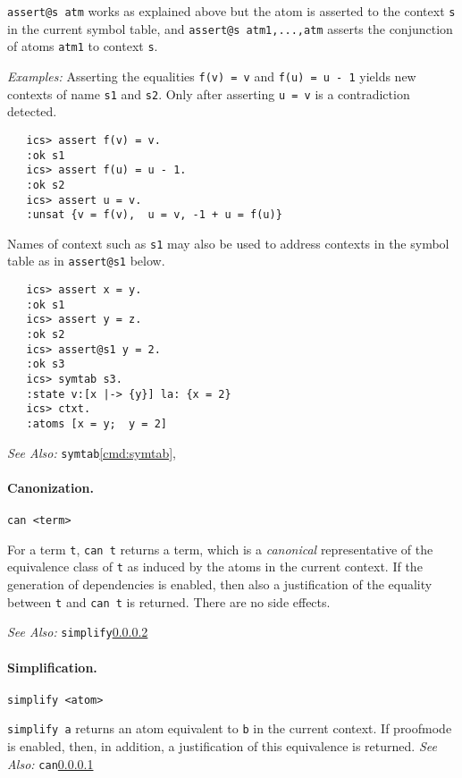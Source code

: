 \documentclass[12pt]{article}
\begin{document}
 \texttt {assert@s atm} works as explained above but the atom is asserted to
 the context \texttt{s} in the current symbol table, and 
 \texttt {assert@s atm1,...,atm} asserts the conjunction of atoms \texttt{atm1} to 
 context \texttt{s}.

\noindent
{\em Examples:} Asserting the equalities \texttt{f(v) = v} and \texttt{f(u) = u - 1}
yields new contexts of name \texttt{s1} and \texttt{s2}\@. Only after 
asserting \texttt{u = v} is a contradiction detected.
   \begin{verbatim}
   ics> assert f(v) = v.
   :ok s1
   ics> assert f(u) = u - 1.
   :ok s2
   ics> assert u = v.
   :unsat {v = f(v),  u = v, -1 + u = f(u)}
   \end{verbatim}
Names of context such as \texttt{s1} may also be used to address contexts in the
symbol table as in \texttt{assert@s1} below.
   \begin{verbatim}
   ics> assert x = y.
   :ok s1
   ics> assert y = z.
   :ok s2
   ics> assert@s1 y = 2.
   :ok s3
   ics> symtab s3.
   :state v:[x |-> {y}] la: {x = 2}
   ics> ctxt.
   :atoms [x = y;  y = 2]
   \end{verbatim}

\noindent
{\em See Also:}  \texttt{symtab}\ref{cmd:symtab},


\paragraph{Canonization.}\label{cmd:can}
  \begin{center}
  \texttt{can <term>}
  \end{center}
For a term \texttt{t}, \texttt{can t} returns a term,
which is a {\em canonical} representative of the equivalence 
class of \texttt{t} as induced by the atoms in the current 
context. If the generation of dependencies is enabled, then also 
a justification of the equality between \texttt{t} and \texttt{can t}
is returned. There are no side effects.

\noindent
{\em See Also:}  \texttt{simplify}\ref{cmd:simplify}


\paragraph{Simplification.}\label{cmd:simplify}
  \begin{center}
  \texttt{simplify <atom>}
  \end{center}
  \texttt{simplify a} returns an atom equivalent to \texttt{b} in the current
  context. If proofmode is enabled, then, in addition, a justification
  of this equivalence is returned.
\noindent
{\em See Also:}  \texttt{can}\ref{cmd:can}
\end{document}
